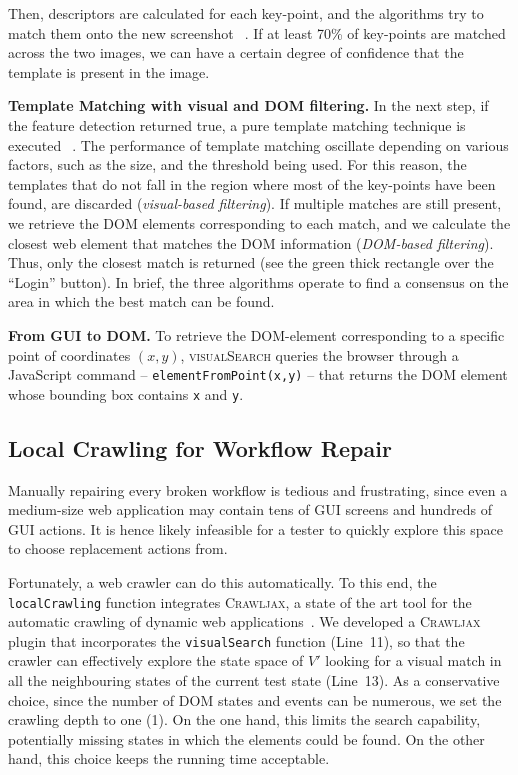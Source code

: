 Then, descriptors are calculated for each key-point, and the algorithms try to match them onto the new screenshot~\textcircled{}.
If at least 70\% of key-points are matched across the two images, we can have a certain degree of confidence that the template is present in the image. 

\noindent
\textbf{Template Matching with visual and DOM filtering.}
In the next step, if the feature detection returned true, a pure template matching technique is executed~\textcircled{}. The performance of template matching oscillate depending on various factors, such as the size, and the threshold being used. For this reason, the templates that do not fall in the region where most of the key-points have been found, are discarded (\textit{visual-based filtering}). If multiple matches are still present, we retrieve the DOM elements corresponding to each match, and we calculate the closest web element that matches the DOM information (\textit{DOM-based filtering}).
Thus, only the closest match is returned (see the green thick rectangle over the ``Login'' button). In brief, the three algorithms operate to find a consensus on the area in which the best match can be found. 

\noindent
\textbf{From GUI to DOM.}
To retrieve the DOM-element corresponding to a specific point of coordinates $(x,y)$, \textsc{visualSearch} queries the browser through a JavaScript command -- \texttt{elementFromPoint(x,y)} -- that returns the DOM element whose bounding box contains \texttt{x} and \texttt{y}. 


\subsection{Local Crawling for Workflow Repair}

Manually repairing every broken workflow is tedious and frustrating, since even a medium-size web application may contain tens of GUI screens and hundreds of GUI actions. It is hence likely infeasible for a tester to quickly explore this space to choose replacement actions from.

Fortunately, a web crawler can do this automatically. To this end, the \texttt{localCrawling} function integrates \textsc{Crawljax}, a state of the art tool for the automatic crawling of dynamic web applications~\cite{mesbah:tweb12,mesbah:tse12}. We developed a \textsc{Crawljax} plugin that incorporates the \texttt{visualSearch} function (Line~11), so that the crawler can effectively explore the state space of $V'$ looking for a visual match in all the neighbouring states of the current test state (Line~13). As a conservative choice, since the number of DOM states and events can be numerous, we set the crawling depth to one (1). On the one hand, this limits the search capability, potentially missing states in which the elements could be found. On the other hand, this choice keeps the running time acceptable.

